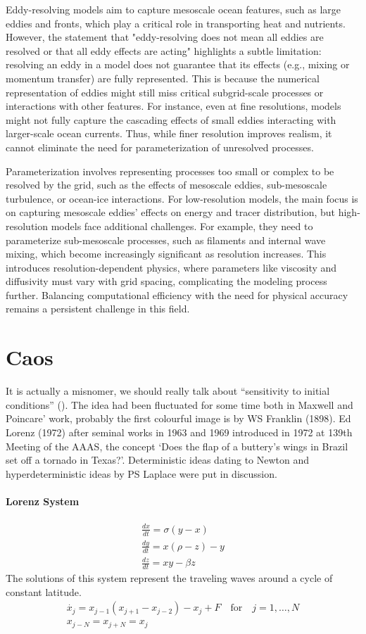 Eddy-resolving models aim to capture mesoscale ocean features, such as large eddies and fronts, which play a critical role in transporting heat and nutrients. However, the statement that "eddy-resolving does not mean all eddies are resolved or that all eddy effects are acting" highlights a subtle limitation: resolving an eddy in a model does not guarantee that its effects (e.g., mixing or momentum transfer) are fully represented. This is because the numerical representation of eddies might still miss critical subgrid-scale processes or interactions with other features. For instance, even at fine resolutions, models might not fully capture the cascading effects of small eddies interacting with larger-scale ocean currents. Thus, while finer resolution improves realism, it cannot eliminate the need for parameterization of unresolved processes.

Parameterization involves representing processes too small or complex to be resolved by the grid, such as the effects of mesoscale eddies, sub-mesoscale turbulence, or ocean-ice interactions. For low-resolution models, the main focus is on capturing mesoscale eddies' effects on energy and tracer distribution, but high-resolution models face additional challenges. For example, they need to parameterize sub-mesoscale processes, such as filaments and internal wave mixing, which become increasingly significant as resolution increases. This introduces resolution-dependent physics, where parameters like viscosity and diffusivity must vary with grid spacing, complicating the modeling process further. Balancing computational efficiency with the need for physical accuracy remains a persistent challenge in this field.

\section{Caos}
It is actually a misnomer, we should really talk about
“sensitivity to initial conditions” (\cite{chaosbook}). The idea had been fluctuated for some time both in
Maxwell and Poincare’ work, probably the first
colourful image is by WS Franklin (1898). Ed Lorenz (1972) after seminal works in 1963 and 1969 introduced in 1972 at 139th Meeting of the AAAS, the concept ‘Does the flap of a buttery’s wings in Brazil set off a tornado in Texas?’.
Deterministic ideas dating to Newton and hyperdeterministic ideas by PS Laplace were put in discussion.
\paragraph{Lorenz System}
\begin{align}\label{eq.lorenz system}
	\frac{dx}{dt}=\sigma(y-x) \\
	\frac{dy}{dt}=x(\rho-z)-y \\
	\frac{dz}{dt}=xy-\beta z
\end{align}
The solutions of this system represent the traveling waves around a cycle of constant latitude.
\begin{align*}
	\dot{x_j}=x_{j-1}(x_{j+1}-x_{j-2})-x_j+F \quad \text{for} \quad j=1,\dots,N \\
	x_{j-N}=x_{j+N}=x_j
\end{align*}
